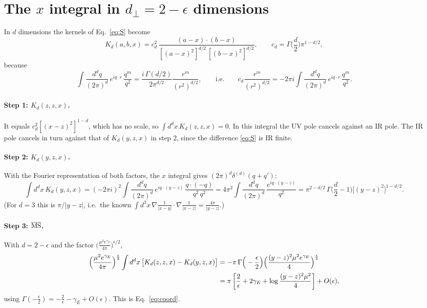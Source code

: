 \documentclass[10pt]{article}
\numberwithin{equation}{section}
\begin{document}
\section{The \texorpdfstring{$x$}{x} integral in \texorpdfstring{$d_\perp=2-\epsilon$}{d=2-eps} dimensions}\label{sec:dimreg}
In $d$ dimensions the kernels of Eq.~\eqref{eq:S} become
\begin{equation}
K_d(a,b,x)=c_d^2\,\frac{(a-x)\cdot(b-x)}{[(a-x)^2]^{d/2}\,[(b-x)^2]^{d/2}},\qquad c_d=\Gamma\Big(\frac d2\Big)\pi^{1-d/2},
\end{equation}
because
\begin{equation}
\int\frac{d^dq}{(2\pi)^d}\,e^{iq\cdot r}\,\frac{q^m}{q^2}=\frac{i\,\Gamma(d/2)}{2\pi^{d/2}}\frac{r^m}{(r^2)^{d/2}},\qquad\text{i.e.}\qquad c_d\frac{r^m}{(r^2)^{d/2}}=-2\pi i\int\frac{d^dq}{(2\pi)^d}\,e^{iq\cdot r}\,\frac{q^m}{q^2}.
\end{equation}
\paragraph{Step 1: $K_d(z,z,x)$.} It equals $c_d^2[(x-z)^2]^{1-d}$, which has no scale, so $\int d^dx\,K_d(z,z,x)=0$. In this integral the UV pole cancels against an IR pole. The IR pole cancels in turn against that of $K_d(y,z,x)$ in step 2, since the difference \eqref{eq:S} is IR finite.
\paragraph{Step 2: $K_d(y,z,x)$.} With the Fourier representation of both factors, the $x$ integral gives $(2\pi)^d\delta^{(d)}(q+q')$:
\begin{equation}
\int d^dx\,K_d(y,z,x)=(-2\pi i)^2\int\frac{d^dq}{(2\pi)^d}\,e^{iq\cdot(y-z)}\,\frac{q\cdot(-q)}{q^2\,q^2}=4\pi^2\int\frac{d^dq}{(2\pi)^d}\,\frac{e^{iq\cdot(y-z)}}{q^2}=\pi^{2-d/2}\,\Gamma\Big(\frac d2-1\Big)\big[(y-z)^2\big]^{1-d/2}.
\end{equation}
(For $d=3$ this is $\pi/|y-z|$, i.e.\ the known $\int d^3x\,\nabla\frac1{|x-y|}\cdot\nabla\frac1{|x-z|}=\frac{4\pi}{|y-z|}$.)
\paragraph{Step 3: $\overline{\rm MS}$.} With $d=2-\epsilon$ and the factor $\big(\frac{\mu^2e^{\gamma_E}}{4\pi}\big)^{\epsilon/2}$,
\begin{align}
\Big(\frac{\mu^2e^{\gamma_E}}{4\pi}\Big)^{\frac\epsilon2}\int d^dx\,\big[K_d(z,z,x)-K_d(y,z,x)\big]
&=-\pi\,\Gamma\Big(-\frac\epsilon2\Big)\Big(\frac{(y-z)^2\mu^2e^{\gamma_E}}{4}\Big)^{\frac\epsilon2}\notag\\
&=\pi\left[\frac2\epsilon+2\gamma_E+\log\frac{(y-z)^2\mu^2}{4}\right]+O(\epsilon),
\label{eq:dimreg}
\end{align}
using $\Gamma(-\frac\epsilon2)=-\frac2\epsilon-\gamma_E+O(\epsilon)$. This is Eq.~\eqref{eq:coord}.
\end{document}
